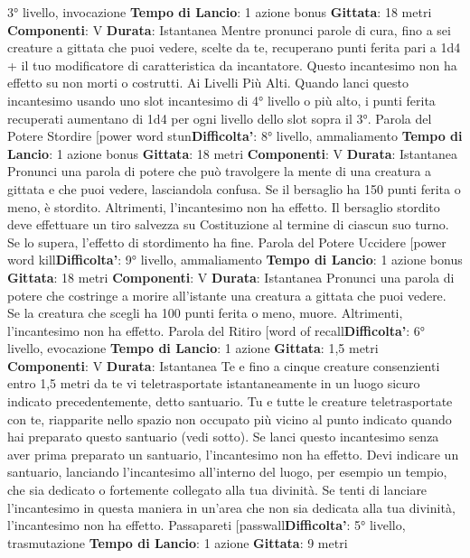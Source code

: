\begin{multicols}{2}
3° livello, invocazione
\textbf{Tempo di Lancio}: 1 azione bonus
\textbf{Gittata}: 18 metri
\textbf{Componenti}: V
\textbf{Durata}: Istantanea
Mentre pronunci parole di cura, fino a sei creature a
gittata che puoi vedere, scelte da te, recuperano punti
ferita pari a 1d4 + il tuo modificatore di caratteristica da
incantatore. Questo incantesimo non ha effetto su non
morti o costrutti.
Ai Livelli Più Alti. Quando lanci questo incantesimo
usando uno slot incantesimo di 4° livello o più alto, i
punti ferita recuperati aumentano di 1d4 per ogni livello
dello slot sopra il 3°.
Parola del Potere Stordire
[power word stun\textbf{Difficolta'}:
8° livello, ammaliamento
\textbf{Tempo di Lancio}: 1 azione bonus
\textbf{Gittata}: 18 metri
\textbf{Componenti}: V
\textbf{Durata}: Istantanea
Pronunci una parola di potere che può travolgere la
mente di una creatura a gittata e che puoi vedere,
lasciandola confusa. Se il bersaglio ha 150 punti ferita o
meno, è stordito. Altrimenti, l’incantesimo non ha
effetto.
Il bersaglio stordito deve effettuare un tiro salvezza su
Costituzione al termine di ciascun suo turno. Se lo
supera, l’effetto di stordimento ha fine.
Parola del Potere Uccidere
[power word kill\textbf{Difficolta'}:
9° livello, ammaliamento
\textbf{Tempo di Lancio}: 1 azione bonus
\textbf{Gittata}: 18 metri
\textbf{Componenti}: V
\textbf{Durata}: Istantanea
Pronunci una parola di potere che costringe a morire
all’istante una creatura a gittata che puoi vedere. Se la
creatura che scegli ha 100 punti ferita o meno, muore.
Altrimenti, l’incantesimo non ha effetto.
Parola del Ritiro
[word of recall\textbf{Difficolta'}:
6° livello, evocazione
\textbf{Tempo di Lancio}: 1 azione
\textbf{Gittata}: 1,5 metri
\textbf{Componenti}: V
\textbf{Durata}: Istantanea
Te e fino a cinque creature consenzienti entro 1,5 metri
da te vi teletrasportate istantaneamente in un luogo
sicuro indicato precedentemente, detto santuario. Tu e
tutte le creature teletrasportate con te, riapparite nello
spazio non occupato più vicino al punto indicato quando
hai preparato questo santuario (vedi sotto). Se lanci
questo incantesimo senza aver prima preparato un
santuario, l’incantesimo non ha effetto.
Devi indicare un santuario, lanciando l’incantesimo
all’interno del luogo, per esempio un tempio, che sia
dedicato o fortemente collegato alla tua divinità. Se tenti
di lanciare l’incantesimo in questa maniera in un’area
che non sia dedicata alla tua divinità, l’incantesimo non
ha effetto.
Passapareti
[passwall\textbf{Difficolta'}:
5° livello, trasmutazione
\textbf{Tempo di Lancio}: 1 azione
\textbf{Gittata}: 9 metri

\end{multicols}
